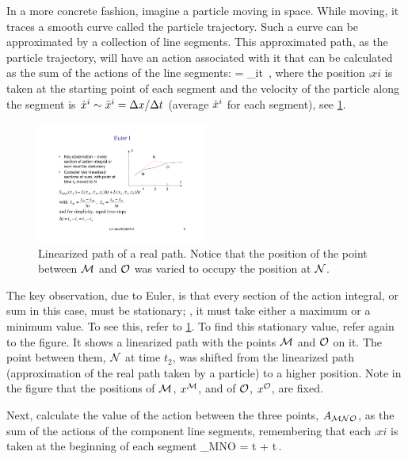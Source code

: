 In a more concrete fashion, imagine a particle moving in space. While moving, it traces a smooth curve called the particle trajectory. Such a curve can be approximated by a collection of line segments. This approximated path, as the particle trajectory, will have an action associated with it that can be calculated as the sum of the actions of the line segments:
\beq
\action = \sum_{i}\lag{}\diff t \,,
\eeq
where the position $\comp xi$ is taken at the starting point of each segment and the velocity of the particle along the segment is ${\dot{x}}^{i}\sim {\bar{x}}^{i} = \Delta x/\Delta t$ (average ${\dot{x}}^{i}$ for each segment), see \cref{fig:approxpath}.
%
%
\begin{figure}[bt]\label{fig:approxpath}
  \caption{Linearized path of a real path. Notice that the position of the point between $\mathcal{M}$ and $\mathcal{O}$ was varied to occupy the position at $\mathcal{N}$.}
  \centering
    \includegraphics[width=0.5\textwidth]{./graphs/action-path.pdf}
\end{figure}
%

\newcommand{\pospoint}[1]{\comp{\pvec}{\point{#1}}}
\newcommand{\avelpoint}[1]{\comp{\bar{\pvec}}{\point{#1}}}

The key observation, due to Euler, is that every section of the action integral, or sum in this case, must be stationary; \ie, it must take either a maximum or a minimum value. To see this, refer to \cref{fig:approxpath}. To find this stationary value, refer again to the figure. It shows a linearized path with the points $\mathcal{M}$ and $\mathcal{O}$ on it. The point between them, $\mathcal{N}$ at time $t_2$, was shifted from the linearized path (approximation of the real path taken by a particle) to a higher position. Note in the figure that the positions of $\mathcal{M}$, $\pospoint M$, and of $\mathcal{O}$, $\pospoint O$, are fixed. 

Next, calculate the value of the action between the three points, $A_{\mathcal{M}\mathcal{N}\mathcal{O}}$, as the sum of the actions of the component line segments, remembering that each $\comp xi$ is taken at the beginning of each segment
\beq
\action_{\point M\point N\point O} = \lag\vat{\pospoint M, \avelpoint M, t_1}\diff t 
                                   + \lag\vat{\pospoint N, \avelpoint N, t_2}\diff t\,.
\eeq

